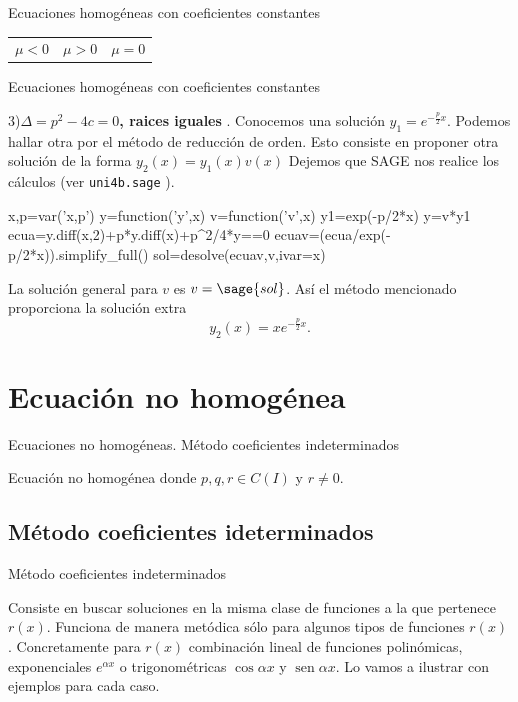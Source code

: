 \documentclass[handout,hyperref={colorlinks=true}]{beamer}
\DeclareMathOperator{\sen}{sen}
\newcommand{\nl}{\onslide<+-> }
\begin{document}
\begin{frame}{Ecuaciones homogéneas con coeficientes constantes}
\begin{tabular}{c c c}
 $\mu<0$ & $\mu>0$ & $\mu=0$\\
\end{tabular}




\end{frame}


\begin{frame}[fragile]{Ecuaciones homogéneas con coeficientes constantes}


3)\textbf{$\boxed{\Delta=p^2-4c=0}$, raices iguales }. Conocemos una solución $\boxed{y_1=e^{-\frac{p}{2}x}}$. Podemos hallar otra
por el método de reducción de orden. Esto consiste en proponer otra solución de la forma $y_2(x)=y_1(x)v(x)$ Dejemos que SAGE nos realice los
cálculos (ver \texttt{uni4b.sage} ).
\begin{sageblock}
x,p=var('x,p')
y=function('y',x)
v=function('v',x)
y1=exp(-p/2*x)
y=v*y1
ecua=y.diff(x,2)+p*y.diff(x)+p^2/4*y==0
ecuav=(ecua/exp(-p/2*x)).simplify_full()
sol=desolve(ecuav,v,ivar=x)
\end{sageblock}
La solución general para $v$ es $v=\sage{sol}$. Así el método mencionado proporciona la solución extra 
\[\boxed{y_2(x)=xe^{-\frac{p}{2}x}}.\]
\end{frame}


\section{Ecuación no homogénea}

\begin{frame}{Ecuaciones no homogéneas. Método coeficientes indeterminados}
\nl \begin{block}{Ecuación no homogénea}
donde $p,q,r \in C(I)$ y $r\neq 0$.
 \end{block}

\subsection{Método coeficientes ideterminados}

\nl \begin{block}{Método coeficientes indeterminados}
 
Consiste en buscar soluciones en la misma clase de funciones a la que pertenece $r(x)$. Funciona de manera metódica sólo para algunos tipos de funciones $r(x)$. 
Concretamente para $r(x)$ combinación lineal de funciones polinómicas, exponenciales $e^{\alpha x}$ o trigonométricas $\cos \alpha x$ y $\sen \alpha x$. 
Lo vamos a ilustrar con ejemplos para cada caso.
 \end{block}
 \end{frame}
\end{document}
